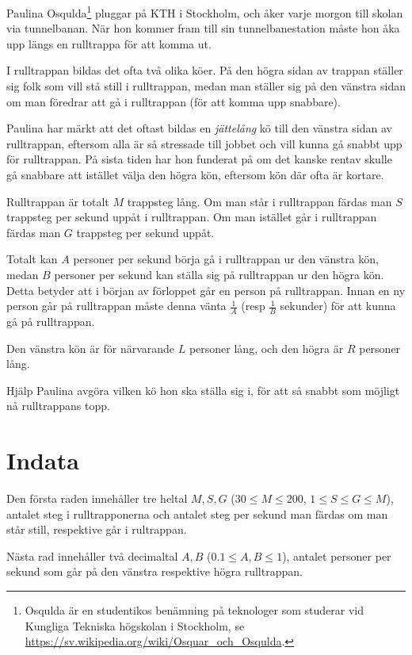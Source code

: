 Paulina Osqulda\footnote{Osqulda är en studentikos benämning på teknologer som studerar vid Kungliga Tekniska högskolan i Stockholm, se \url{https://sv.wikipedia.org/wiki/Osquar_och_Osqulda}.} pluggar på KTH i Stockholm, och åker varje morgon till skolan via tunnelbanan.
När hon kommer fram till sin tunnelbanestation måste hon åka upp längs en rulltrappa för att komma ut.

I rulltrappan bildas det ofta två olika köer.
På den högra sidan av trappan ställer sig folk som vill stå still i rulltrappan, medan man ställer sig på den vänstra sidan om man föredrar att gå i rulltrappan (för att komma upp snabbare).

Paulina har märkt att det oftast bildas en \emph{jättelång} kö till den vänstra sidan av rulltrappan, eftersom alla är så stressade till jobbet och vill kunna gå snabbt upp för rulltrappan.
På sista tiden har hon funderat på om det kanske rentav skulle gå snabbare att istället välja den högra kön, eftersom kön där ofta är kortare.

Rulltrappan är totalt $M$ trappsteg lång.
Om man står i rulltrappan färdas man $S$ trappsteg per sekund uppåt i rulltrappan.
Om man istället går i rulltrappan färdas man $G$ trappsteg per sekund uppåt.

Totalt kan $A$ personer per sekund börja gå i rulltrappan ur den vänstra kön, medan $B$ personer per sekund kan ställa sig på rulltrappan ur den högra kön.
Detta betyder att i början av förloppet går en person på rulltrappan.
Innan en ny person går på rulltrappan måste denna vänta $\frac{1}{A}$ (resp $\frac{1}{B}$ sekunder) för att kunna gå på rulltrappan.

Den vänstra kön är för närvarande $L$ personer lång, och den högra är $R$ personer lång.

Hjälp Paulina avgöra vilken kö hon ska ställa sig i, för att så snabbt som möjligt nå rulltrappans topp.

\section*{Indata}
Den första raden innehåller tre heltal $M, S, G$ ($30 \le M \le 200$, $1 \le S \le G \le M$), antalet steg i rulltrapponerna och antalet steg per sekund man färdas om man står still, respektive går i rultrappan.

Nästa rad innehåller två decimaltal $A, B$ ($0.1 \le A, B \le 1$), antalet personer per sekund som går på den vänstra respektive högra rulltrappan.

